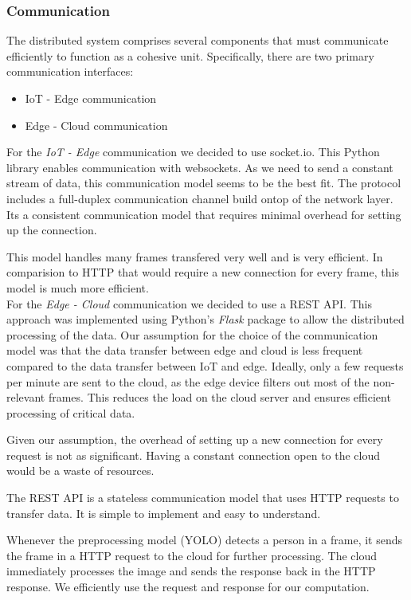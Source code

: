 \documentclass[conference]{IEEEtran}
\begin{document}
\subsubsection{Communication}
The distributed system comprises several components that must communicate efficiently to function as a cohesive unit. Specifically, there are two primary communication interfaces:
\\
\begin{itemize}
    \item IoT - Edge communication
    \item Edge - Cloud communication
\end{itemize}

\hfill \break
For the \textit{IoT - Edge} communication we decided to use socket.io. This Python library enables communication with websockets. As we need to send a constant stream of data, this communication model seems to be the best fit. The protocol includes a full-duplex communication channel build ontop of the network layer. Its a consistent communication model that requires minimal overhead for setting up the connection. 

This model handles many frames transfered very well and is very efficient. In comparision to HTTP that would require a new connection for every frame, this model is much more efficient. 
\\


For the \textit{Edge - Cloud} communication we decided to use a REST API. This approach was implemented using Python's \textit{Flask} package to allow the distributed processing of the data. 
Our assumption for the choice of the communication model was that the data transfer between edge and cloud is less frequent compared to the data transfer between IoT and edge. Ideally, only a few requests per minute are sent to the cloud, as the edge device filters out most of the non-relevant frames. This reduces the load on the cloud server and ensures efficient processing of critical data.

Given our assumption, the overhead of setting up a new connection for every request is not as significant. Having a constant connection open to the cloud would be a waste of resources. 

The REST API is a stateless communication model that uses HTTP requests to transfer data. It is simple to implement and easy to understand. 

Whenever the preprocessing model (YOLO) detects a person in a frame, it sends the frame in a HTTP request to the cloud for further processing. 
The cloud immediately processes the image and sends the response back in the HTTP response. We efficiently use the request and response for our computation. 
\hfill \break
\end{document}
